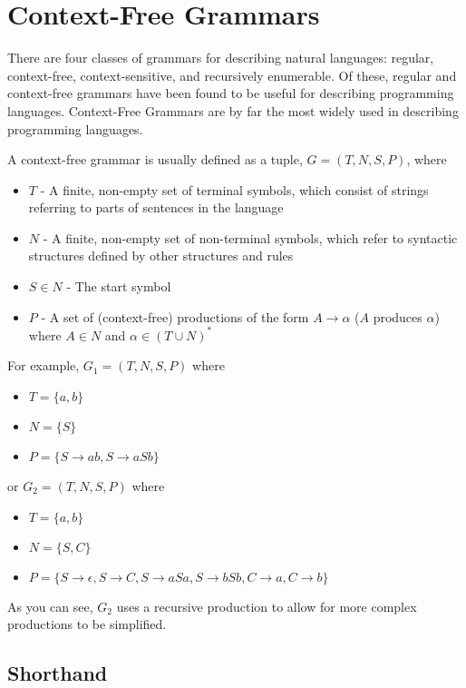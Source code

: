 
\section*{Context-Free Grammars}

There are four classes of grammars for describing natural languages: regular, context-free, context-sensitive, and
 recursively enumerable. Of these, regular and context-free grammars have been found to be useful for describing
 programming languages. Context-Free Grammars are by far the most widely used in describing programming languages.

A context-free grammar is usually defined as a tuple, $G = (T, N, S, P)$, where
\begin{itemize}
  \item $T$ - A finite, non-empty set of terminal symbols, which consist of strings referring to parts of sentences in
   the language
  \item $N$ - A finite, non-empty set of non-terminal symbols, which refer to syntactic structures defined by other
   structures and rules
  \item $S \in N$ - The start symbol
  \item $P$ - A set of (context-free) productions of the form $A \rightarrow \alpha$ ($A$ produces $\alpha$) where $A \in N$
   and $\alpha \in {(T \cup N)}^*$
\end{itemize}

For example, $G_1 = (T, N, S, P)$ where
\begin{itemize}
  \item $T = \{a, b\}$
  \item $N = \{S\}$
  \item $P = \{S \rightarrow ab, S \rightarrow aSb\}$
\end{itemize}
or $G_2 = (T, N, S, P)$ where
\begin{itemize}
  \item $T = \{a, b\}$
  \item $N = \{S, C\}$
  \item $P = \{S \rightarrow \epsilon, S \rightarrow C, S \rightarrow aSa, S \rightarrow bSb, C \rightarrow a, C \rightarrow b\}$
\end{itemize}
As you can see, $G_2$ uses a recursive production to allow for more complex productions to be simplified.

\subsection*{Shorthand}

